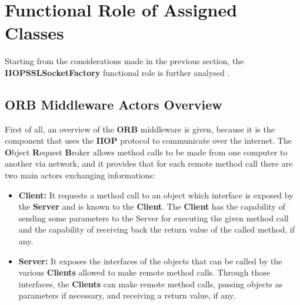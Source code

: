 \section{Functional Role of Assigned Classes}

Starting from the considerations made in the previous section, the \textbf{IIOPSSLSocketFactory} functional role is further analysed .

\subsection{ORB Middleware Actors Overview}
First of all, an overview of the \textbf{ORB} middleware is given, because it is the component that uses the \textbf{IIOP} protocol to communicate over the internet.
The \textbf{O}bject \textbf{R}equest \textbf{B}roker allows method calls to be made from one computer to another via network, and it provides that for each remote method call there are two main actors exchanging informations:
\begin{itemize}
	\item \textbf{Client:}
		It requests a method call to an object which interface is exposed by the \textbf{Server} and is known to the \textbf{Client}.
		The \textbf{Client} has the capability of sending some parameters to the Server for executing the given method call and the capability of receiving back the return value of the called method, if any.
	\item \textbf{Server:}
		It exposes the interfaces of the objects that can be called by the various \textbf{Clients} allowed to make remote method calls.
		Through those interfaces, the \textbf{Clients} can make remote method calls, passing objects as parameters if necessary, and receiving a return value, if any.
\end{itemize}

